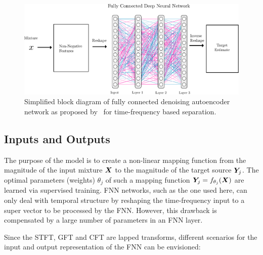 \begin{figure}[ht!]
\centering
        \includegraphics[width=\textwidth]{Chapters/06_Separation_Unknown/figures/uhlich_dnn.pdf}
\caption{Simplified block diagram of fully connected denoising autoencoder network as proposed by~\cite{uhlich15} for time-frequency based separation.}
\label{fig:cft_dnn}
\end{figure}

\subsection{Inputs and Outputs}

The purpose of the model is to create a non-linear mapping function from the magnitude of the input mixture \({\bm{X}}\) to the magnitude of the target source \({\bm{Y}}_j\).
The optimal parameters (weights) \(\theta_j\) of such a mapping function \({\bm{Y}}_j = f_{\theta_j}({\bm{X}})\) are learned via supervised training.
\acs{FNN} networks, such as the one used here, can only deal with temporal structure by reshaping the time-frequency input to a super vector to be processed by the \acs{FNN}. 
However, this drawback is compensated by a large number of parameters in an \acs{FNN} layer.

Since the \acs{STFT}, GFT and CFT are lapped transforms, different scenarios for the input and output representation of the \acs{FNN} can be envisioned:

